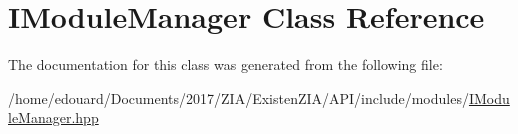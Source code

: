 \hypertarget{classIModuleManager}{}\section{I\+Module\+Manager Class Reference}
\label{classIModuleManager}


The documentation for this class was generated from the following file\+:\begin{DoxyCompactItemize}
\item 
/home/edouard/\+Documents/2017/\+Z\+I\+A/\+Existen\+Z\+I\+A/\+A\+P\+I/include/modules/\mbox{\hyperlink{IModuleManager_8hpp}{I\+Module\+Manager.\+hpp}}\end{DoxyCompactItemize}
